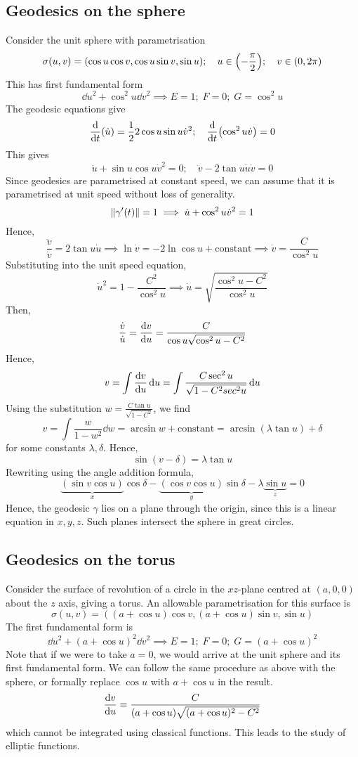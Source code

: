 \subsection{Geodesics on the sphere}
Consider the unit sphere with parametrisation
\[
	\sigma(u,v) = (\cos u \cos v, \cos u \sin v, \sin u);\quad u \in \qty(-\frac{\pi}{2});\quad v \in \qty(0, 2 \pi)
\]
This has first fundamental form
\[
	\dd{u}^2 + \cos^2 u \dd{v}^2 \implies E = 1;\; F = 0;\; G = \cos^2 u
\]
The geodesic equations give
\[
	\dv{t} \qty(\dot u) = \frac{1}{2} 2\cos u \sin u \dot v^2;\quad \dv{t} \qty(\cos^2 u \dot v) = 0
\]
This gives
\[
	\ddot u + \sin u \cos u \dot v^2 = 0;\quad \ddot v - 2 \tan u \dot u \dot v = 0
\]
Since geodesics are parametrised at constant speed, we can assume that it is parametrised at unit speed without loss of generality.
\[
	\norm{\gamma'(t)} = 1 \implies \dot u + \cos^2 u \dot v^2 = 1
\]
Hence,
\[
	\frac{\ddot v}{\dot v} = 2 \tan u \dot u \implies \ln \dot v = -2 \ln \cos u + \text{constant} \implies \dot v = \frac{C}{\cos^2 u}
\]
Substituting into the unit speed equation,
\[
	\dot u^2 = 1 - \frac{C^2}{\cos^2 u} \implies \dot u = \sqrt{\frac{\cos^2 u - C^2}{\cos^2 u}}
\]
Then,
\[
	\frac{\dot v}{\dot u} = \dv{v}{u} = \frac{C}{\cos u \sqrt{\cos^2 u - C^2}}
\]
Hence,
\[
	v = \int \dv{v}{u} \dd{u} = \int \frac{C \sec^2 u}{\sqrt{1-C^2 sec^2 u}} \dd{u}
\]
Using the substitution \( w = \frac{C \tan u}{\sqrt{1-C^2}} \), we find
\[
	v = \int \frac{w}{1-w^2} \dd{w} = \arcsin w + \text{constant} = \arcsin(\lambda \tan u) + \delta
\]
for some constants \( \lambda, \delta \).
Hence,
\[
	\sin (v - \delta) = \lambda \tan u
\]
Rewriting using the angle addition formula,
\[
	\underbrace{(\sin v \cos u)}_{x}\cos \delta - \underbrace{(\cos v \cos u)}_{y}\sin \delta - \lambda \underbrace{\sin u}_z = 0
\]
Hence, the geodesic \( \gamma \) lies on a plane through the origin, since this is a linear equation in \( x, y, z \).
Such planes intersect the sphere in great circles.

\subsection{Geodesics on the torus}
Consider the surface of revolution of a circle in the \( xz \)-plane centred at \( (a,0,0) \) about the \( z \) axis, giving a torus.
An allowable parametrisation for this surface is
\[
	\sigma(u,v) = ((a+\cos u)\cos v, (a+\cos u)\sin v, \sin u)
\]
The first fundamental form is
\[
	\dd{u}^2 + (a+\cos u)^2 \dd{v}^2 \implies E = 1;\;F = 0;\;G = (a+\cos u)^2
\]
Note that if we were to take \( a = 0 \), we would arrive at the unit sphere and its first fundamental form.
We can follow the same procedure as above with the sphere, or formally replace \( \cos u \) with \( a+\cos u \) in the result.
\[
	\dv{v}{u} = \frac{C}{(a+\cos u)\sqrt{(a+\cos u)^2 - C^2}}
\]
which cannot be integrated using classical functions.
This leads to the study of elliptic functions.


